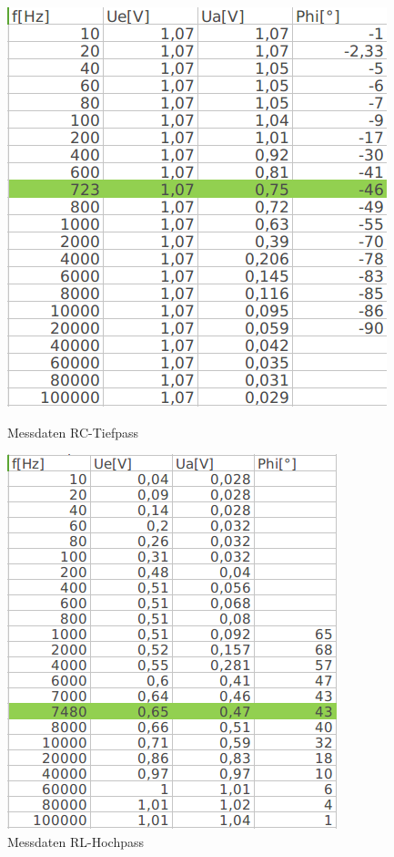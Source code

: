 \documentclass[12pt,a4paper,titlepage]{article}
\begin{document}
\begin{figure}[H]
  \centering
  \begin{minipage}[b]{0.4\textwidth}
    \includegraphics[width=\textwidth]{rc_data.png}
    \caption{Messdaten RC-Tiefpass}
  \end{minipage}
  \hfill
  \begin{minipage}[b]{0.4\textwidth}
    \includegraphics[width=\textwidth]{rl_data.png}
    \caption{Messdaten RL-Hochpass}
  \end{minipage}
\end{figure}
\end{document}
